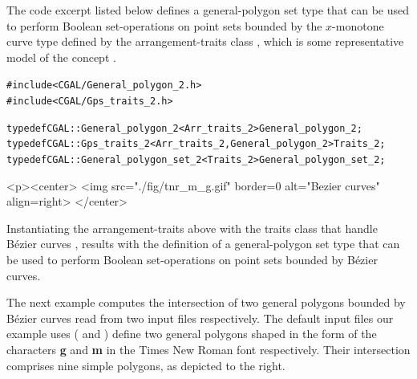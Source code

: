 The code excerpt listed below defines a general-polygon set type that
can be used to perform Boolean set-operations on point sets bounded by
the $x$-monotone curve type defined by the arrangement-traits class
, which is some representative model of the concept
.
\begin{alltt}
#include <CGAL/General_polygon_2.h>
#include <CGAL/Gps_traits_2.h>

typedef CGAL::General_polygon_2<Arr_traits_2>               General_polygon_2;
typedef CGAL::Gps_traits_2<Arr_traits_2, General_polygon_2> Traits_2;
typedef CGAL::General_polygon_set_2<Traits_2>               General_polygon_set_2;
\end{alltt}

\lcTex{%
  \setlength{\BooleanSetOpsWidthRight}{3.4cm}
  \setlength{\BooleanSetOpsWidthLeft}{\BooleanSetOpsWidthLineReal}
  \addtolength{\BooleanSetOpsWidthLeft}{-\BooleanSetOpsWidthRight}
  \begin{minipage}{\BooleanSetOpsWidthLeft}
}
\label{fig:conics}
\begin{ccHtmlOnly}
  <p><center>
    <img src="./fig/tnr_m_g.gif" border=0 alt="Bezier curves" align=right>
  </center>
\end{ccHtmlOnly}
Instantiating the arrangement-traits  above with the
traits class that handle B\'ezier curves ,
results with the definition of a general-polygon set type that can be
used to perform Boolean set-operations on point sets bounded by B\'ezier
curves.

The next example computes the intersection of two general polygons
bounded by B\'ezier curves read from two input files respectively. The
default input files our example uses ( and
) define two general polygons shaped in the form of
the characters {\bf g} and {\bf m} in the Times New Roman font
respectively. Their intersection comprises nine simple polygons, as
depicted to the right.



